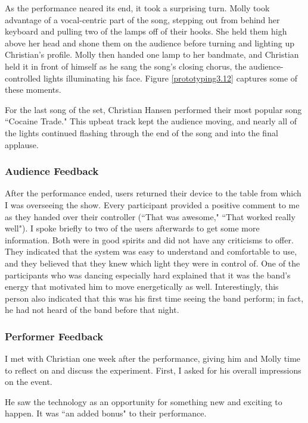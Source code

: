 As the performance neared its end, it took a surprising turn. Molly took advantage of a vocal-centric part of the song, stepping out from behind her keyboard and pulling two of the lamps off of their hooks. She held them high above her head and shone them on the audience before turning and lighting up Christian's profile. Molly then handed one lamp to her bandmate, and Christian held it in front of himself as he sang the song's closing chorus, the audience-controlled lights illuminating his face. Figure \ref{prototyping3.12} captures some of these moments.

For the last song of the set, Christian Hansen performed their most popular song ``Cocaine Trade." This upbeat track kept the audience moving, and nearly all of the lights continued flashing through the end of the song and into the final applause.

\subsubsection{Audience Feedback}

After the performance ended, users returned their device to the table from which I was overseeing the show. Every participant provided a positive comment to me as they handed over their controller (``That was awesome," ``That worked really well"). I spoke briefly to two of the users afterwards to get some more information. Both were in good spirits and did not have any criticisms to offer. They indicated that the system was easy to understand and comfortable to use, and they believed that they knew which light they were in control of. One of the participants who was dancing especially hard explained that it was the band's energy that motivated him to move energetically as well. Interestingly, this person also indicated that this was his first time seeing the band perform; in fact, he had not heard of the band before that night.

\subsubsection{Performer Feedback}

I met with Christian one week after the performance, giving him and Molly time to reflect on and discuss the experiment. First, I asked for his overall impressions on the event.

He saw the technology as an opportunity for something new and exciting to happen. It was ``an added bonus" to their performance.

